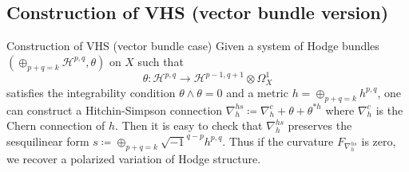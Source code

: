 \documentclass[aspectratio=169, 10pt]{beamer}
\theoremstyle{definition}
\theoremstyle{example}
\begin{document}
\subsection{Construction of VHS (vector bundle version)}
    \begin{frame}{Construction of VHS (vector bundle case)}
		Given a system of Hodge bundles $(\oplus_{p+q=k} \mathcal{H}^{p,q},\theta)$ on $X$ such that \[\theta: \mathcal{H}^{p,q}\to \mathcal{H}^{p-1,q+1}\otimes \Omega_X^1\] satisfies the integrability condition $\theta\wedge \theta=0$ and a metric $h=\oplus_{p+q=k} h^{p,q}$, one can construct a Hitchin-Simpson connection $\nabla_h^{hs}\coloneqq \nabla_h^c+\theta+\theta^{*h}$ where $\nabla_h^c$ is the Chern connection of $h$. Then it is easy to check that $\nabla_h^{hs}$ preserves the sesquilinear form $s\coloneqq \oplus_{p+q=k}\sqrt{-1}^{q-p}h^{p,q}$. Thus if the curvature $F_{\nabla_h^{hs}}$ is zero, we recover a polarized variation of Hodge structure. 
	\end{frame}
\end{document}
